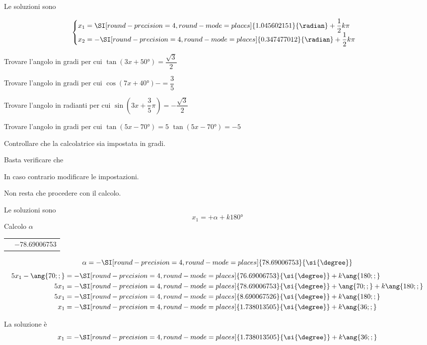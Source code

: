 \begin{exercise}
 	Le soluzioni sono
 	
 	\[\begin{cases}
x_1=\SI[round-precision=\lungarrotandamento,round-mode=places]{1.045602151}{\radian}+\dfrac{1}{2}k\pi\\
x_2=-\SI[round-precision=\lungarrotandamento,round-mode=places]{0.347477012}{\radian}+\dfrac{1}{2}k\pi\\
 	\end{cases}\]
 \end{exercise}
 \begin{exercise}[no solution]
 	Trovare l'angolo in gradi per cui $\tan (3x+\ang{50;;})=\dfrac{\sqrt{3}}{2}$
 \end{exercise}
 \begin{exercise}[no solution]
 	Trovare l'angolo in gradi per cui $\cos (7x+\ang{40;;})-=\dfrac{3}{5}$
 \end{exercise}
 \begin{exercise}[no solution]
 	Trovare l'angolo in radianti per cui $\sin (3x+\dfrac{3}{5}\pi)=-\dfrac{\sqrt{3}}{2}$
 \end{exercise}
\begin{exercise}
	Trovare l'angolo in gradi per cui $\tan (5x-\ang{70;;})=5$
	\tcblower
	$\tan (5x-\ang{70;;})=-5$
	
	Controllare che la calcolatrice sia impostata in gradi.
	
	Basta verificare che 
	\testgradi
	
	In caso contrario modificare le impostazioni.
	
	Non resta che procedere con il calcolo.
	
	Le soluzioni sono 
	\[x_1=+\alpha+k\ang{180;;}\]
	Calcolo $\alpha$
	\begin{center}
		\begin{tabular}{ll}
			\tastoitan\tasto{\num[round-precision=1,round-mode=places]{5}}
			\tastouguale&\num[round-precision=\lungarrotandamento,round-mode=places]{-78.69006753} 
		\end{tabular} 
	\end{center}
	\[\alpha=-\SI[round-precision=\lungarrotandamento,round-mode=places]{78.69006753}{\si{\degree}}\]
	\begin{align*}
	5x_1-\ang{70;;}&=-\SI[round-precision=\lungarrotandamento,round-mode=places]{76.69006753}{\si{\degree}}+k\ang{180;;}\\
	5x_1&=-\SI[round-precision=\lungarrotandamento,round-mode=places]{78.69006753}{\si{\degree}}+\ang{70;;}+k\ang{180;;}\\
	5x_1&=-\SI[round-precision=\lungarrotandamento,round-mode=places]{8.690067526}{\si{\degree}}+k\ang{180;;}\\
	x_1&=-\SI[round-precision=\lungarrotandamento,round-mode=places]{1.738013505}{\si{\degree}}+k\ang{36;;}
	\end{align*}
	
	La soluzione è
	\[x_1=-\SI[round-precision=\lungarrotandamento,round-mode=places]{1.738013505}{\si{\degree}}+k\ang{36;;}\]
\end{exercise}
